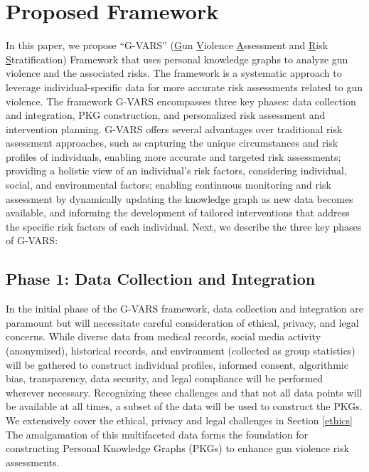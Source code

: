 \documentclass[11pt]{article}
\begin{document}

\section{Proposed Framework}
In this paper, we propose ``\textsf{G-VARS}'' (\ul{G}un \ul{V}iolence \ul{A}ssessment and \ul{R}isk \ul{S}tratification) Framework that uses personal knowledge graphs to analyze gun violence and the associated risks. The framework is a systematic approach to leverage individual-specific data for more accurate risk assessments related to gun violence. The framework \textsf{G-VARS} encompasses three key phases: data collection and integration, PKG construction, and personalized risk assessment and intervention planning. \textsf{G-VARS} offers several advantages over traditional risk assessment approaches, such as capturing the unique circumstances and risk profiles of individuals, enabling more accurate and targeted risk assessments; providing a holistic view of an individual's risk factors, considering individual, social, and environmental factors; enabling continuous monitoring and risk assessment by dynamically updating the knowledge graph as new data becomes available, and informing the development of tailored interventions that address the specific risk factors of each individual. Next, we describe the three key phases of \textsf{G-VARS}:

\subsection*{Phase 1: Data Collection and Integration}
In the initial phase of the \textsf{G-VARS} framework, data collection and integration are paramount but will necessitate careful consideration of ethical, privacy, and legal concerns. While diverse data from medical records, social media activity (anonymized), historical records, and environment (collected as group statistics) will be gathered to construct individual profiles, informed consent, algorithmic bias, transparency, data security, and legal compliance will be performed wherever necessary. Recognizing these challenges and that not all data points will be available at all times, a subset of the data will be used to construct the PKGs. We extensively cover the ethical, privacy and legal challenges in Section \ref{ethics} The amalgamation of this multifaceted data forms the foundation for constructing Personal Knowledge Graphs (PKGs) to enhance gun violence risk assessments.
\end{document}
